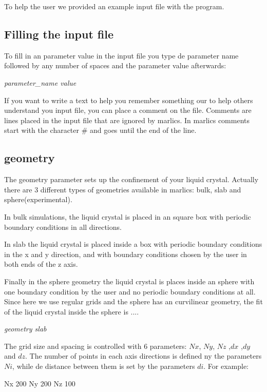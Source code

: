 \documentclass{article}
\newcommand{\consoleline}[2][0.5cm]
{\vspace{#1}
\textit{{#2}}
\vspace{#1}
}
\begin{document}
To help the user we provided an example input file with the program.

\subsection{Filling the input file}

To fill in an parameter value in the input file you type de parameter name followed by any number of spaces and the parameter value afterwards:

\consoleline{parameter\_name value}

If you want to write a text to help you remember something our to help others understand you input file, you can place a comment on the file. Comments are lines placed in the input file that are ignored by marlics. In marlics comments start with the character \# and goes until the end of the line.

\subsection{geometry}


The geometry parameter sets up the confinement of your liquid crystal. Actually there are 3 different types of geometries available in marlics: bulk, slab and sphere(experimental).

In bulk simulations, the liquid crystal is placed in an square box with periodic boundary conditions in all directions.

In slab the liquid crystal is placed inside a box with periodic boundary conditions in the x and y direction, and with boundary conditions chosen by the user in both ends of the z axis.

Finally in the sphere geometry the liquid crystal is places inside an sphere with one boundary condition  by the user and no periodic boundary conditions at all. Since here we use regular grids and the sphere has an curvilinear geometry, the fit of the liquid crystal inside the sphere is ....

\consoleline{geometry  slab}

The grid size and spacing is controlled with 6 parameters: $Nx$, $Ny$, $Nz$ ,$dx$ ,$dy$ and $dz$. The number of points in each axis directions is defined ny the parameters $Ni$, while de distance between them is set by the parameters $di$. For example:

Nx 200             %
Ny 200             %
Nz 100             %
\end{document}
